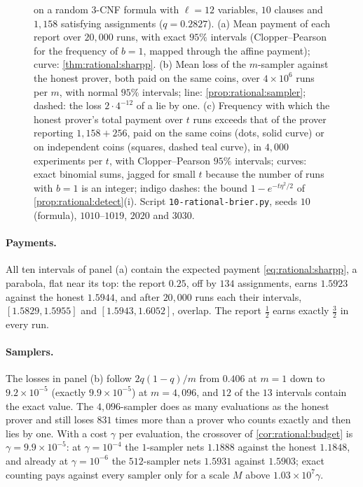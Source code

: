 \begin{refsection}
\begin{figure}[t]
\caption{ on a random 3-CNF formula with $\ell=12$ variables, $10$ clauses and $1{,}158$ satisfying assignments ($q=0.2827$). (a) Mean payment of each report over $20{,}000$ runs, with exact $95\%$ intervals (Clopper--Pearson for the frequency of $b=1$, mapped through the affine payment); curve: \cref{thm:rational:sharpp}. (b) Mean loss of the $m$-sampler against the honest prover, both paid on the same coins, over $4\times10^6$ runs per $m$, with normal $95\%$ intervals; line: \cref{prop:rational:sampler}; dashed: the loss $2\cdot4^{-12}$ of a lie by one. (c) Frequency with which the honest prover's total payment over $t$ runs exceeds that of the prover reporting $1{,}158+256$, paid on the same coins (dots, solid curve) or on independent coins (squares, dashed teal curve), in $4{,}000$ experiments per $t$, with Clopper--Pearson $95\%$ intervals; curves: exact binomial sums, jagged for small $t$ because the number of runs with $b=1$ is an integer; indigo dashes: the bound $1-e^{-t\eta^2/2}$ of \cref{prop:rational:detect}(i). Script \texttt{10-rational-brier.py}, seeds $10$ (formula), $1010$--$1019$, $2020$ and $3030$.}\label{fig:rational:runs}
\end{figure}

\paragraph{Payments.} All ten intervals of panel (a) contain the expected payment \eqref{eq:rational:sharpp}, a parabola, flat near its top: the report $0.25$, off by $134$ assignments, earns $1.5923$ against the honest $1.5944$, and after $20{,}000$ runs each their intervals, $[1.5829,1.5955]$ and $[1.5943,1.6052]$, overlap. The report $\frac12$ earns exactly $\frac32$ in every run.

\paragraph{Samplers.} The losses in panel (b) follow $2q(1-q)/m$ from $0.406$ at $m=1$ down to $9.2\times10^{-5}$ (exactly $9.9\times10^{-5}$) at $m=4{,}096$, and $12$ of the $13$ intervals contain the exact value. The $4{,}096$-sampler does as many evaluations as the honest prover and still loses $831$ times more than a prover who counts exactly and then lies by one. With a cost $\gamma$ per evaluation, the crossover of \cref{cor:rational:budget} is $\gamma=9.9\times10^{-5}$: at $\gamma=10^{-4}$ the $1$-sampler nets $1.1888$ against the honest $1.1848$, and already at $\gamma=10^{-6}$ the $512$-sampler nets $1.5931$ against $1.5903$; exact counting pays against every sampler only for a scale $M$ above $1.03\times10^7\gamma$.


\end{refsection}
